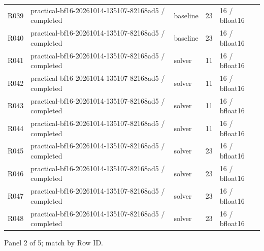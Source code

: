 \documentclass[10pt]{article}
\begin{document}
{\begin{longtable}{p{}p{}p{}p{}p{}}
R039 & practical-bf16-20261014-135107-82168ad5 / completed & baseline & 23 & 16 / bfloat16 \\
R040 & practical-bf16-20261014-135107-82168ad5 / completed & baseline & 23 & 16 / bfloat16 \\
R041 & practical-bf16-20261014-135107-82168ad5 / completed & solver & 11 & 16 / bfloat16 \\
R042 & practical-bf16-20261014-135107-82168ad5 / completed & solver & 11 & 16 / bfloat16 \\
R043 & practical-bf16-20261014-135107-82168ad5 / completed & solver & 11 & 16 / bfloat16 \\
R044 & practical-bf16-20261014-135107-82168ad5 / completed & solver & 11 & 16 / bfloat16 \\
R045 & practical-bf16-20261014-135107-82168ad5 / completed & solver & 23 & 16 / bfloat16 \\
R046 & practical-bf16-20261014-135107-82168ad5 / completed & solver & 23 & 16 / bfloat16 \\
R047 & practical-bf16-20261014-135107-82168ad5 / completed & solver & 23 & 16 / bfloat16 \\
R048 & practical-bf16-20261014-135107-82168ad5 / completed & solver & 23 & 16 / bfloat16 \\
\end{longtable}}
\par\noindent Panel 2 of 5; match by Row ID.
\end{document}
